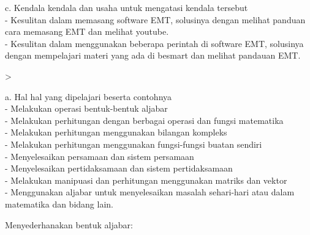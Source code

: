 \documentclass[a4paper,10pt]{article}
\begin{document}
\begin{eulernotebook}
\begin{eulercomment}
\begin{eulercomment}
\begin{eulercomment}
c. Kendala kendala dan usaha untuk mengatasi kendala tersebut\\
- Kesulitan dalam memasang software EMT, solusinya dengan melihat
panduan cara memasang EMT dan melihat youtube.\\
- Kesulitan dalam menggunakan beberapa perintah di software EMT,
solusinya dengan mempelajari materi yang ada di besmart dan melihat
pandauan EMT.\\
\end{eulercomment}
\eulersubheading{}
\begin{eulerprompt}
> 
\end{eulerprompt}
\begin{eulercomment}
a. Hal hal yang dipelajari beserta contohnya\\
- Melakukan operasi bentuk-bentuk aljabar\\
- Melakukan perhitungan dengan berbagai operasi dan fungsi matematika\\
- Melakukan perhitungan menggunakan bilangan kompleks\\
- Melakukan perhitungan menggunakan fungsi-fungsi buatan sendiri\\
- Menyelesaikan persamaan dan sistem persamaan\\
- Menyelesaikan pertidaksamaan dan sistem pertidaksamaan\\
- Melakukan manipuasi dan perhitungan menggunakan matriks dan vektor\\
- Menggunakan aljabar untuk menyelesaikan masalah sehari-hari atau
dalam matematika dan bidang lain.\\
\end{eulercomment}
\begin{eulercomment}
Menyederhanakan bentuk aljabar:


\end{eulercomment}
\end{eulercomment}
\end{eulercomment}
\end{eulernotebook}
\end{document}
